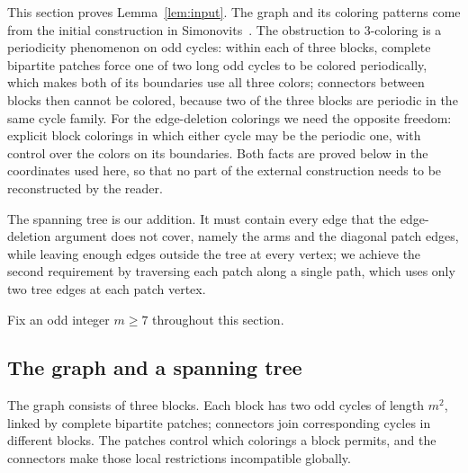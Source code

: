 \documentclass[11pt,letterpaper]{article}
\numberwithin{equation}{section}
\theoremstyle{plain}
\theoremstyle{definition}
\theoremstyle{remark}
\begin{document}
This section proves Lemma~\ref{lem:input}. The graph and its coloring patterns come from the initial construction in Simonovits~\cite[pp.~74--79]{Simonovits}. The obstruction to $3$-coloring is a periodicity phenomenon on odd cycles: within each of three blocks, complete bipartite patches force one of two long odd cycles to be colored periodically, which makes both of its boundaries use all three colors; connectors between blocks then cannot be colored, because two of the three blocks are periodic in the same cycle family. For the edge-deletion colorings we need the opposite freedom: explicit block colorings in which either cycle may be the periodic one, with control over the colors on its boundaries. Both facts are proved below in the coordinates used here, so that no part of the external construction needs to be reconstructed by the reader.

The spanning tree is our addition. It must contain every edge that the edge-deletion argument does not cover, namely the arms and the diagonal patch edges, while leaving enough edges outside the tree at every vertex; we achieve the second requirement by traversing each patch along a single path, which uses only two tree edges at each patch vertex.

Fix an odd integer $m\ge 7$ throughout this section.

\subsection{The graph and a spanning tree}\label{sec:graph}

The graph consists of three blocks. Each block has two odd cycles of length $m^2$, linked by complete bipartite patches; connectors join corresponding cycles in different blocks. The patches control which colorings a block permits, and the connectors make those local restrictions incompatible globally.
\end{document}
